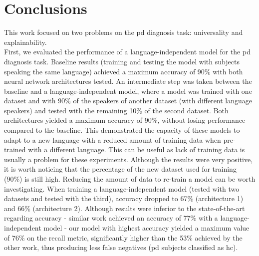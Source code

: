 
\chapter{Conclusions}
\label{ch:magna}


This work focused on two problems on the \gls{pd} diagnosis task: universality and explainability. \\
First, we evaluated the performance of a language-independent model for the \gls{pd} diagnosis task. Baseline results (training and testing the model with subjects speaking the same language) achieved a maximum accuracy of 90\% with both neural network architectures tested. An intermediate step was taken between the baseline and a language-independent model, where a model was trained with one dataset and with 90\% of the speakers of another dataset (with different language speakers) and tested with the remaining 10\% of the second dataset. Both architectures yielded a maximum accuracy of 90\%, without losing performance compared to the baseline. This demonstrated the capacity of these models to adapt to a new language with a reduced amount of training data when pre-trained with a different language. This can be useful as lack of training data is usually a problem for these experiments. Although the results were very positive, it is worth noticing that the percentage of the new dataset used for training (90\%) is still high. Reducing the amount of data to re-train a model can be worth investigating. When training a language-independent model (tested with two datasets and tested with the third), accuracy dropped to 67\% (architecture 1) and 66\% (architecture 2). Although results were inferior to the state-of-the-art regarding accuracy - similar work achieved an accuracy of 77\% with a language-independent model \cite{parkinson_three_languages} - our model with highest accuracy yielded a maximum value of 76\% on the recall metric, significantly higher than the 53\% achieved by the other work, thus producing less false negatives (\gls{pd} subjects classified as \gls{hc}). \\
